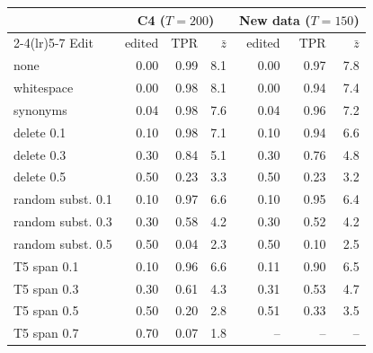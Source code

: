 \begin{tabular}{@{}l rrr rrr@{}}
\toprule
 & \multicolumn{3}{c}{C4 ($T{=}200$)} & \multicolumn{3}{c}{New data ($T{=}150$)} \\
\cmidrule(lr){2-4}\cmidrule(lr){5-7}
Edit & edited & TPR & $\bar z$ & edited & TPR & $\bar z$ \\
\midrule
none & 0.00 & 0.99 & 8.1 & 0.00 & 0.97 & 7.8 \\
whitespace & 0.00 & 0.98 & 8.1 & 0.00 & 0.94 & 7.4 \\
synonyms & 0.04 & 0.98 & 7.6 & 0.04 & 0.96 & 7.2 \\
delete 0.1 & 0.10 & 0.98 & 7.1 & 0.10 & 0.94 & 6.6 \\
delete 0.3 & 0.30 & 0.84 & 5.1 & 0.30 & 0.76 & 4.8 \\
delete 0.5 & 0.50 & 0.23 & 3.3 & 0.50 & 0.23 & 3.2 \\
random subst. 0.1 & 0.10 & 0.97 & 6.6 & 0.10 & 0.95 & 6.4 \\
random subst. 0.3 & 0.30 & 0.58 & 4.2 & 0.30 & 0.52 & 4.2 \\
random subst. 0.5 & 0.50 & 0.04 & 2.3 & 0.50 & 0.10 & 2.5 \\
T5 span 0.1 & 0.10 & 0.96 & 6.6 & 0.11 & 0.90 & 6.5 \\
T5 span 0.3 & 0.30 & 0.61 & 4.3 & 0.31 & 0.53 & 4.7 \\
T5 span 0.5 & 0.50 & 0.20 & 2.8 & 0.51 & 0.33 & 3.5 \\
T5 span 0.7 & 0.70 & 0.07 & 1.8 & -- & -- & -- \\
\bottomrule
\end{tabular}